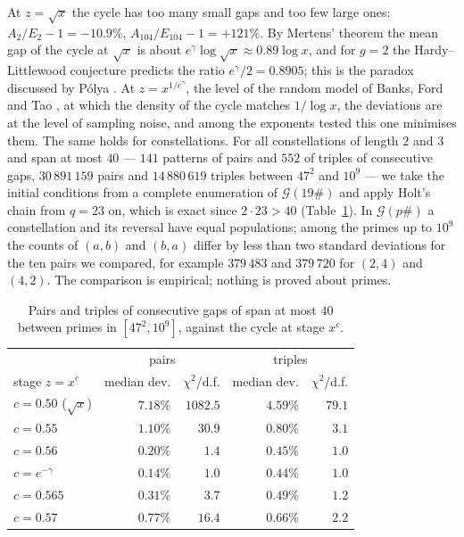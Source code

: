 \documentclass[11pt]{article}
\theoremstyle{definition}
\theoremstyle{remark}
\newcommand{\G}{\mathcal{G}}
\begin{document}
At $z = \sqrt{x}$ the cycle has too many small gaps and too few large ones: $A_2/E_2 - 1 = -10.9\%$, $A_{104}/E_{104} - 1 = +121\%$. By Mertens' theorem the mean gap of the cycle at $\sqrt{x}$ is about $e^\gamma \log \sqrt{x} \approx 0.89 \log x$, and for $g = 2$ the Hardy--Littlewood conjecture predicts the ratio $e^\gamma/2 = 0.8905$; this is the paradox discussed by P\'olya \cite{Po59}. At $z = x^{1/e^\gamma}$, the level of the random model of Banks, Ford and Tao \cite{BFT23}, at which the density of the cycle matches $1/\log x$, the deviations are at the level of sampling noise, and among the exponents tested this one minimises them. The same holds for constellations. For all constellations of length $2$ and $3$ and span at most $40$ --- $141$ patterns of pairs and $552$ of triples of consecutive gaps, $30\,891\,159$ pairs and $14\,880\,619$ triples between $47^2$ and $10^9$ --- we take the initial conditions from a complete enumeration of $\G(19\#)$ and apply Holt's chain from $q = 23$ on, which is exact since $2 \cdot 23 > 40$ (Table~\ref{tab:survival2}). In $\G(p\#)$ a constellation and its reversal have equal populations; among the primes up to $10^9$ the counts of $(a,b)$ and $(b,a)$ differ by less than two standard deviations for the ten pairs we compared, for example $379\,483$ and $379\,720$ for $(2,4)$ and $(4,2)$. The comparison is empirical; nothing is proved about primes.

\begin{table}[ht]
\centering
\begin{tabular}{lrrrr}
\toprule
 & \multicolumn{2}{c}{pairs} & \multicolumn{2}{c}{triples} \\
stage $z = x^c$ & median dev. & $\chi^2$/d.f. & median dev. & $\chi^2$/d.f. \\
\midrule
$c = 0.50$ ($\sqrt{x}$) & $7.18\%$ & $1082.5$ & $4.59\%$ & $79.1$ \\
$c = 0.55$ & $1.10\%$ & $30.9$ & $0.80\%$ & $3.1$ \\
$c = 0.56$ & $0.20\%$ & $1.4$ & $0.45\%$ & $1.0$ \\
$c = e^{-\gamma}$ & $0.14\%$ & $1.0$ & $0.44\%$ & $1.0$ \\
$c = 0.565$ & $0.31\%$ & $3.7$ & $0.49\%$ & $1.2$ \\
$c = 0.57$ & $0.77\%$ & $16.4$ & $0.66\%$ & $2.2$ \\
\bottomrule
\end{tabular}
\caption{Pairs and triples of consecutive gaps of span at most $40$ between primes in $[47^2, 10^9]$, against the cycle at stage $x^c$.}\label{tab:survival2}
\end{table}
\end{document}

